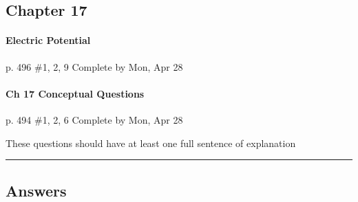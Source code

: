 \documentclass[10pt]{exam}
\begin{document}


\subsection*{Chapter 17}




\paragraph{Electric Potential} p. 496 \#1, 2, 9
\dotfill Complete by Mon, Apr 28





\paragraph{Ch 17 Conceptual Questions} p. 494 \#1, 2, 6
\dotfill Complete by Mon, Apr 28
   
{\sc These questions should have at least one full sentence 
      of explanation}


\hrule











\subsection*{Answers}
\end{document}

